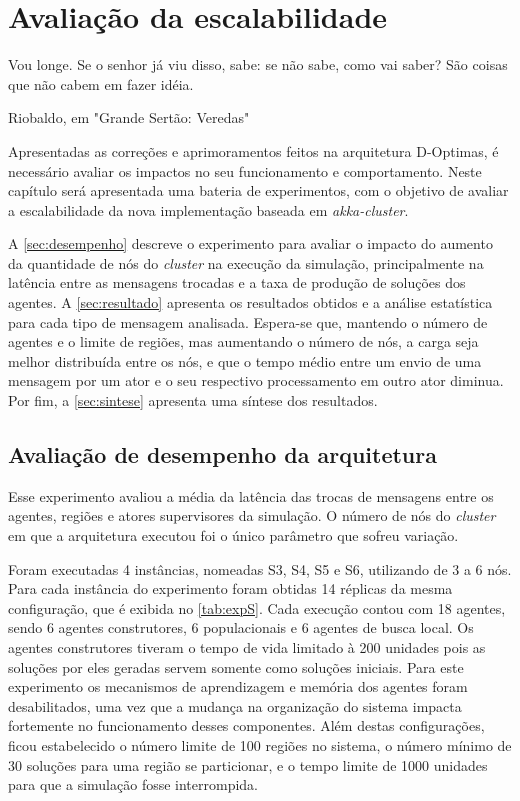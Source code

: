 

\chapter{Avaliação da escalabilidade}
\label{chap:exp_preliminares}

\epigraph{Vou longe. Se o senhor já viu disso, sabe: se não sabe, como vai saber? São coisas que não cabem em fazer idéia.}{Riobaldo, em "Grande Sertão: Veredas"}

Apresentadas as correções e aprimoramentos feitos na arquitetura D-Optimas, é necessário avaliar os impactos no seu funcionamento e comportamento. Neste capítulo será apresentada uma  bateria de experimentos, com o objetivo de avaliar a escalabilidade da nova implementação baseada em \textit{akka-cluster}.

A \autoref{sec:desempenho} descreve o experimento para avaliar o impacto do aumento da quantidade de nós do \textit{cluster} na execução da simulação, principalmente na latência entre as mensagens trocadas e a taxa de produção de soluções dos agentes. A \autoref{sec:resultado} apresenta os resultados obtidos e a análise estatística para cada tipo de mensagem analisada. Espera-se que, mantendo o número de agentes e o limite de regiões, mas aumentando o número de nós, a carga seja melhor distribuída entre os nós, e que o tempo médio entre um envio de uma mensagem por um ator e o seu respectivo processamento em outro ator diminua. Por fim, a \autoref{sec:sintese} apresenta uma síntese dos resultados. 

\section{Avaliação de desempenho da arquitetura}
\label{sec:desempenho}

Esse experimento avaliou a média da latência das trocas de mensagens entre os agentes, regiões e atores supervisores da simulação. O número de nós do \textit{cluster} em que a arquitetura executou foi o único parâmetro que sofreu variação. 

Foram executadas 4 instâncias, nomeadas S3, S4, S5 e S6, utilizando de 3 a 6 nós. Para cada instância do experimento foram obtidas 14 réplicas da mesma configuração, que é exibida no \autoref{tab:expS}. Cada execução contou com 18 agentes, sendo 6 agentes construtores, 6 populacionais e 6 agentes de busca local. Os agentes construtores tiveram o tempo de vida limitado à 200 unidades pois as soluções por eles geradas servem somente como soluções iniciais.
Para este experimento os mecanismos de aprendizagem e memória dos agentes foram desabilitados, uma vez que a mudança na organização do sistema impacta fortemente no funcionamento desses componentes. 
Além destas configurações, ficou estabelecido o número limite de 100 regiões no sistema, o número mínimo de 30 soluções para uma região se particionar, e o tempo limite de 1000 unidades para que a simulação fosse interrompida.

